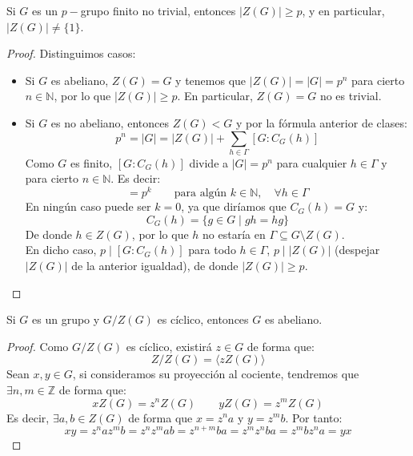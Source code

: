 \begin{teo}[de Burnside]
    Si $G$ es un $p-$grupo finito no trivial, entonces \newline $|Z(G)| \geq p$, y en particular, $|Z(G)| \neq \{1\}$.
    \begin{proof}
        Distinguimos casos:
        \begin{itemize}
            \item Si $G$ es abeliano, $Z(G) = G$ y tenemos que $|Z(G)| = |G| = p^n$ para cierto $n\in \mathbb{N}$, por lo que $|Z(G)| \geq p$. En particular, $Z(G) = G$ no es trivial.
            \item Si $G$ es no abeliano, entonces $Z(G) < G$ y por la fórmula anterior de clases:
                \begin{equation*}
                    p^n = |G| = |Z(G)| + \sum_{h\in \Gamma} [G:C_G(h)]
                \end{equation*}
                Como $G$ es finito, $[G:C_G(h)]$ divide a $|G| = p^n$ para cualquier $h\in \Gamma$ y para cierto $n\in \mathbb{N}$. Es decir:
                \begin{equation*}
                    [G:C_G(h)] = p^k \qquad \text{para algún\ } k\in \mathbb{N}, \quad \forall h\in\Gamma
                \end{equation*}
                En ningún caso puede ser $k = 0$, ya que diríamos que $C_G(h) = G$ y:
                \begin{equation*}
                    C_G(h) = \{g\in G \mid gh=hg\}
                \end{equation*}
                De donde $h\in Z(G)$, por lo que $h$ no estaría en $\Gamma\subseteq G\setminus Z(G)$.\\

                \noindent
                En dicho caso, $p\mid [G:C_G(h)]$ para todo $h\in \Gamma$, $p\mid |Z(G)|$ (despejar $|Z(G)|$ de la anterior igualdad), de donde $|Z(G)| \geq p$.
        \end{itemize}
    \end{proof}
\end{teo}

\begin{lema}
    Si $G$ es un grupo y $G/Z(G)$ es cíclico, entonces $G$ es abeliano.
    \begin{proof}
        Como $G/Z(G)$ es cíclico, existirá $z\in G$ de forma que:
        \begin{equation*}
            Z/Z(G) = \langle zZ(G) \rangle 
        \end{equation*}
        Sean $x,y\in G$, si consideramos su proyección al cociente, tendremos que $\exists n,m\in \mathbb{Z}$ de forma que:
        \begin{equation*}
            xZ(G) = z^nZ(G) \qquad yZ(G) = z^mZ(G)
        \end{equation*}
        Es decir, $\exists a,b\in Z(G)$ de forma que $x = z^na$ y $y = z^mb$. Por tanto:
        \begin{equation*}
            xy = z^naz^mb = z^nz^mab = z^{n+m}ba = z^mz^nba = z^mbz^na = yx
        \end{equation*}
    \end{proof}
\end{lema}

